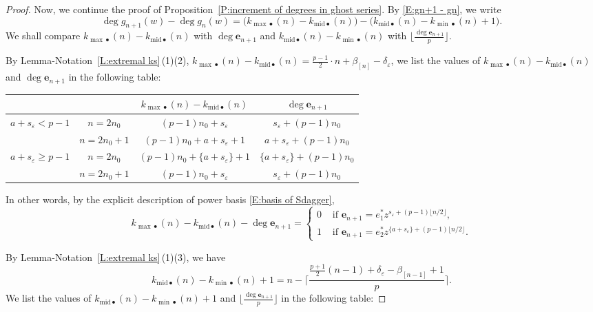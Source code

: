 \documentclass[12pt]{amsart}
\theoremstyle{definition}
\numberwithin{equation}{subsection}
\def\bfe{\mathbf{e}}
\newcommand{\midd}{\mathrm{mid}}
\begin{document}
\begin{proof}
Now, we continue the proof of Proposition~\ref{P:increment of degrees in ghost series}.  By \eqref{E:gn+1 - gn}, we write
$$
\deg g_{n+1}(w) - \deg g_n(w) = \big(k_{{\max}\bullet}(n) - k_{\midd \bullet}(n)\big) - \big(k_{\midd \bullet}(n) -  k_{{\min}\bullet}(n)+1 \big).$$
We shall compare $k_{{\max}\bullet}(n)-k_{\midd \bullet}(n)$ with $\deg \bfe_{n+1}$ and   $k_{\midd \bullet}(n)-k_{{\min}\bullet}(n)$ with $\lfloor \frac{\deg\bfe_{n+1}}{p} \rfloor$.

By Lemma-Notation~\ref{L:extremal ks}\,(1)(2),  $k_{{\max}\bullet}(n)-k_{\midd \bullet}(n)=\frac{p-1}{2}\cdot n+\beta_{[n]}-\delta_{\varepsilon}$, we list the values of $k_{{\max}\bullet}(n)-k_{\midd \bullet}(n)$ and $\deg \bfe_{n+1}$ in the following table:
\begin{center}
\begin{tabular}{|c|c|c|c|}
\hline
 & &$k_{{\max} \bullet}(n)-k_{\midd \bullet}(n)$ & $\deg \bfe_{n+1}$ 
\\
\hline
\multirow{2}{*}{$a+s_\varepsilon < p-1$} & $n=2n_0$ & $(p-1)n_0+s_\varepsilon$& $s_\varepsilon+(p-1)n_0$
\\
\cline{2-4}
& $n=2n_0+1$ &  $(p-1)n_0+a+s_\varepsilon+1$ & $a+s_\varepsilon+(p-1)n_0$
\\
\hline 
\multirow{2}{*}{
$a+s_\varepsilon \geq p-1$} & $n=2n_0$ &$(p-1)n_0+\{a+s_\varepsilon\}+1$ & $\{a+s_\varepsilon\}+(p-1)n_0$ 
\\
\cline{2-4} & $n=2n_0+1$ & $(p-1)n_0+s_\varepsilon$ & $s_\varepsilon+(p-1)n_0$ 
\\
\hline
\end{tabular}
\end{center}
In other words, by the explicit description of power basis \eqref{E:basis of Sdagger},
\begin{equation}
\label{E:kmax-kmid}
k_{\max {\bullet}}(n) - k_{\midd\bullet}(n)  - \deg \bfe_{n+1} = \begin{cases}
0& \textrm{ if }\bfe_{n+1} = e_1^*z^{s_\varepsilon+ (p-1)\lfloor n/2\rfloor},
\\
1 & \textrm{ if }\bfe_{n+1} = e_2^*z^{\{a+s_\varepsilon\}+ (p-1)\lfloor n/2\rfloor}.
\end{cases}
\end{equation}

By Lemma-Notation~\ref{L:extremal ks}\,(1)(3), we have 
$$
k_{{\midd}\bullet}(n)-k_{{\min} \bullet}(n)+1=n-\Big\lceil \frac{\frac{p+1}{2}(n-1)+\delta_\varepsilon-\beta_{[n-1]}+1}{p}\Big\rceil.$$
We list the values of $k_{{\midd}\bullet}(n)-k_{{\min}\bullet}(n)+1$ and $\lfloor\frac {\deg \bfe_{n+1}}p\rfloor$ in the following table:


\end{proof}
\end{document}
